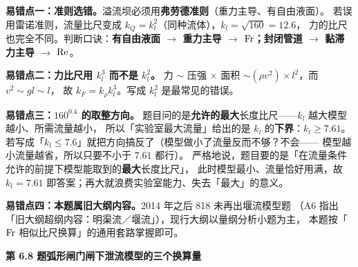 \begin{yicuo}
\textbf{易错点一：准则选错。}溢流坝必须用\textbf{弗劳德准则}（重力主导、有自由液面）。
若误用雷诺准则，流量比尺变成 $k_Q=k_l^{2}$（同种流体），$k_l=\sqrt{160}=12.6$，
力的比尺也完全不同。判断口诀：\textbf{有自由液面 $\to$ 重力主导 $\to$ $\mathrm{Fr}$；封闭管道 $\to$ 黏滞力主导 $\to$ $\mathrm{Re}$}。

\textbf{易错点二：力比尺用 $k_l^{3}$ 而不是 $k_l^{2}$。}
力 $\sim$ 压强 $\times$ 面积 $\sim(\rho v^{2})\times l^{2}$，而 $v^{2}\sim gl\sim l$，
故 $k_F=k_\rho k_l^{3}$。写成 $k_l^{2}$ 是最常见的错误。

\textbf{易错点三：$160^{0.4}$ 的取整方向。}
题目问的是\textbf{允许的最大}长度比尺——$k_l$ 越大模型越小、所需流量越小，
所以「实验室最大流量」给出的是 $k_l$ 的\textbf{下界}：$k_l\ge7.61$。
若写成「$k_l\le7.6$」就把方向搞反了（模型做小了流量反而不够？不会——
模型越小流量越省，所以只要不小于 $7.61$ 都行）。
严格地说，题目要的是「在流量条件允许的前提下模型能取到的\textbf{最大}长度比尺」，
此时模型最小、流量恰好用满，故 $k_l=7.61$ 即答案；再大就浪费实验室能力、失去「最大」的意义。

\textbf{易错点四：本题属旧大纲内容。}2014 年之后 818 未再出堰流模型题
（A6 指出「旧大纲超纲内容：明渠流／堰流」），现行大纲以量纲分析小题为主，
本题按「$\mathrm{Fr}$ 相似比尺换算」的通用套路掌握即可。
\end{yicuo}

\noindent\textbf{第 6.8 题\quad 弧形闸门闸下泄流模型的三个换算量}


